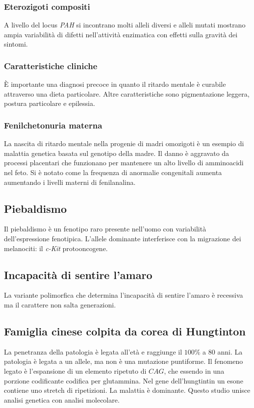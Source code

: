 		\subsubsection{Eterozigoti compositi}
		A livello del locus \emph{PAH} si incontrano molti alleli diversi e alleli mutati mostrano ampia variabilit\`a di difetti nell'attivit\`a enzimatica con effetti sulla gravit\`a dei sintomi.

		\subsubsection{Caratteristiche cliniche}
		\`E importante una diagnosi precoce in quanto il ritardo mentale \`e curabile attraverso una dieta particolare. 
		Altre caratteristiche sono pigmentazione leggera, postura particolare e epilessia. 

		\subsubsection{Fenilchetonuria materna}
		La nascita di ritardo mentale nella progenie di madri omozigoti \`e un esempio di malattia genetica basata sul genotipo della madre. 
		Il danno \`e aggravato da processi placentari che funzionano per mantenere un alto livello di amminoacidi nel feto. 
		Si \`e notato come la frequenza di anormalie congenitali aumenta aumentando i livelli materni di fenilanalina. 

	\subsection{Piebaldismo}
	Il piebaldismo \`e un fenotipo raro presente nell'uomo con variabilit\`a dell'espressione fenotipica.
	L'allele dominante interferisce con la migrazione dei melanociti: il \emph{c-Kit} protooncogene.

	\subsection{Incapacit\`a di sentire l'amaro}
	La variante polimorfica che determina l'incapacit\`a di sentire l'amaro \`e recessiva ma il carattere non salta generazioni.
	
	\subsection{Famiglia cinese colpita da corea di Hungtinton}
	La penetranza della patologia \`e legata all'et\`a e raggiunge il $100\%$ a $80$ anni.
	La patologia \`e legata a un allele, ma non \`e una mutazione puntiforme.
	Il fenomeno legato \`e l'espansione di un elemento ripetuto di $CAG$, che essendo in una porzione codificante codifica per glutammina.
	Nel gene dell'hungtintin un esone contiene uno stretch di ripetizioni.
	La malattia \`e dominante. 
	Questo studio unisce analisi genetica con analisi molecolare.

